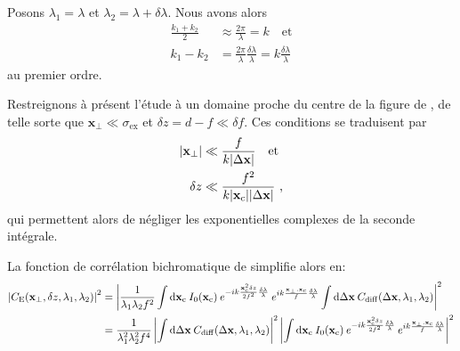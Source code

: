Posons $\lambda_1=\lambda$ et $\lambda_2=\lambda+\delta\lambda$. Nous avons alors
\begin{align}
\frac{k_1+k_2}{2} &\approx \frac{2\pi}{\lambda} =k \quad \text{et}\\
k_1-k_2 &= \frac{2\pi}{\lambda} \frac{\delta\lambda}{\lambda} = k \frac{\delta\lambda}{\lambda}
\end{align}
au premier ordre.

Restreignons à présent l'étude à un domaine proche du centre de la figure de \speckle , de telle sorte que $\mathbf{x}_{\perp}\ll\sigma_{\mathrm{ex}}$ et $\delta z=d-f \ll \delta f$. Ces conditions se traduisent par 
\begin{align}
|\mathbf{x}_{\perp}| &\ll \frac{f}{k |\Delta\mathbf{x}|}  \quad\text{et}\\
\delta z &\ll \frac{f^2}{k|\mathbf{x}_{\mathrm{c}}||\Delta\mathbf{x}|} \text{ ,}
\end{align}
qui permettent alors de négliger les exponentielles complexes de la seconde intégrale.

La fonction de corrélation bichromatique de simplifie alors en:
\begin{align}
\left|C_{\mathrm{E}}(\mathbf{x}_{\perp},\delta z, \lambda_1,\lambda_2)\right|^2 &= \left| \frac{1}{\lambda_1 \lambda_2 f^2} \int{\mathop{}\mathopen{}\mathrm{d}\mathbf{x}_{\mathrm{c}}\: I_0(\mathbf{x}_{\mathrm{c}}) \: e^{-ik\frac{\mathbf{x}_{\mathrm{c}}^2 \delta z}{2f^2} \frac{\delta\lambda}{\lambda}} \: e^{ik \frac{\mathbf{x}_{\perp}.\mathbf{x}_{\mathrm{c}}}{f}\frac{\delta\lambda}{\lambda}}} \int{\mathop{}\mathopen{}\mathrm{d}\Delta\mathbf{x}\: C_{\mathrm{diff}}(\Delta\mathbf{x},\lambda_1,\lambda_2)} \right|^2 \\
&= \frac{1}{\lambda_1^2 \lambda_2^2 f^4} \left| \int{\mathop{}\mathopen{}\mathrm{d}\Delta\mathbf{x}\: C_{\mathrm{diff}}(\Delta\mathbf{x},\lambda_1,\lambda_2)} \right|^2 \left|\int{\mathop{}\mathopen{}\mathrm{d}\mathbf{x}_{\mathrm{c}}\: I_0(\mathbf{x}_{\mathrm{c}}) \: e^{-ik\frac{\mathbf{x}_{\mathrm{c}}^2 \delta z}{2f^2} \frac{\delta\lambda}{\lambda}} \: e^{ik\frac{\mathbf{x}_{\perp}.\mathbf{x}_{\mathrm{c}}}{f}\frac{\delta\lambda}{\lambda}}} \right|^2
\end{align}

